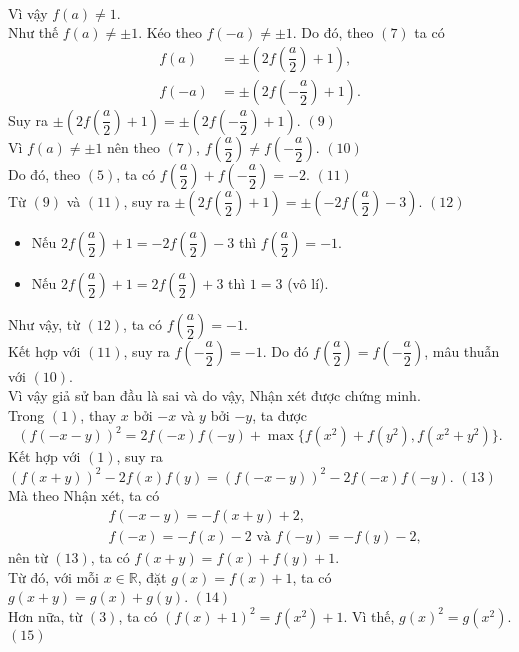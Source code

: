 \begin{bt}
{	\\ Vì vậy $f(a)\neq 1$.
	\\ Như thế $f(a) \neq \pm 1$. Kéo theo $f(-a) \neq \pm 1$. Do đó, theo $(7)$ ta có \begin{align*}
	f(a)&= \pm \left( 2 f\left(\dfrac{a}{2}\right) +1\right), \\ f(-a) &= \pm \left(2 f\left(-\dfrac{a}{2}\right) +1\right).
	\end{align*}
	Suy ra $\pm \left(2 f\left( \dfrac{a}{2}\right) +1 \right) =\pm \left(2 f\left(-\dfrac{a}{2}\right) +1\right).$ \hfill $(9)$
	\\ Vì $f(a) \neq \pm 1$ nên theo $(7)$, $f\left(\dfrac{a}{2}\right) \neq f\left( - \dfrac{a}{2}\right).$ \hfill $(10)$
	\\ Do đó, theo $(5)$, ta có $f\left( \dfrac{a}{2}\right) + f\left( -\dfrac{a}{2}\right)=-2$. \hfill $(11)$
	\\ Từ $(9)$ và $(11)$, suy ra $\pm \left(2 f\left( \dfrac{a}{2}\right) +1 \right) = \pm \left(- 2 f\left( \dfrac{a}{2} \right) -3\right)$. \hfill $(12)$
	\begin{itemize}
		\item Nếu $2f \left( \dfrac{a}{2} \right) +1 =-2 f\left( \dfrac{a}{2} \right) -3$ thì $f\left( \dfrac{a}{2} \right) =-1$.
		\item Nếu $2f \left( \dfrac{a}{2} \right) +1 =2 f\left( \dfrac{a}{2} \right) +3$ thì $1=3$ (vô lí).
	\end{itemize}
Như vậy, từ $(12)$, ta có $f\left( \dfrac{a}{2}\right)=-1$. \\ Kết hợp với $(11)$, suy ra $f\left(-\dfrac{a}{2} \right) =-1$. Do đó $f\left( \dfrac{a}{2} \right) = f\left( - \dfrac{a}{2}\right)$, mâu thuẫn với $(10)$.
\\ Vì vậy giả sử ban đầu là sai và do vậy, Nhận xét được chứng minh.
\\ Trong $(1)$, thay $x$ bởi $-x$ và $y$ bởi $-y$, ta được $$(f(-x-y))^2 =2f(-x)f(-y) + \max \{ f(x^2) +f(y^2),f(x^2+y^2)\}.$$
Kết hợp với $(1)$, suy ra $(f(x+y))^2 -2f(x)f(y) =(f(-x-y))^2 -2f(-x)f(-y)$. \hfill $(13)$
\\ Mà theo Nhận xét, ta có 
\begin{align*}
&f(-x-y) =-f(x+y)+2, \\ &f(-x) =-f(x)-2 \text{ và } f(-y)=-f(y)-2,
\end{align*}
nên từ $(13)$, ta có $f(x+y)=f(x)+f(y)+1$.
\\ Từ đó, với mỗi $x \in \mathbb{R}$, đặt $g(x)=f(x)+1$, ta có $g(x+y)=g(x)+g(y)$. \hfill $(14)$
\\ Hơn nữa, từ $(3)$, ta có $(f(x)+1)^2=f(x^2)+1.$ Vì thế, $g(x)^2=g(x^2)$. \hfill $(15)$
}
\end{bt}
